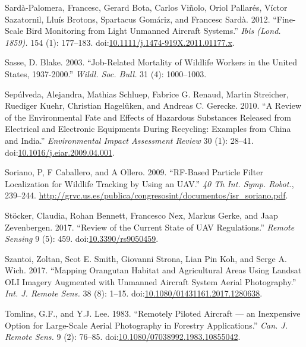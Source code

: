 \documentclass[]{interact}
\theoremstyle{plain}%
\theoremstyle{definition}
\theoremstyle{remark}
\begin{document}
\hypertarget{ref-sarda-palomera_fine-scale_2012}{}
Sardà-Palomera, Francesc, Gerard Bota, Carlos Viñolo, Oriol Pallarés,
Víctor Sazatornil, Lluís Brotons, Spartacus Gomáriz, and Francesc Sardà.
2012. ``Fine-Scale Bird Monitoring from Light Unmanned Aircraft
Systems.'' \emph{Ibis (Lond. 1859).} 154 (1): 177--183.
doi:\href{https://doi.org/10.1111/j.1474-919X.2011.01177.x}{10.1111/j.1474-919X.2011.01177.x}.

\hypertarget{ref-sasse_job-related_2003}{}
Sasse, D. Blake. 2003. ``Job-Related Mortality of Wildlife Workers in
the United States, 1937-2000.'' \emph{Wildl. Soc. Bull.} 31 (4):
1000--1003.

\hypertarget{ref-sepulveda_review_2010}{}
Sepúlveda, Alejandra, Mathias Schluep, Fabrice G. Renaud, Martin
Streicher, Ruediger Kuehr, Christian Hagelüken, and Andreas C. Gerecke.
2010. ``A Review of the Environmental Fate and Effects of Hazardous
Substances Released from Electrical and Electronic Equipments During
Recycling: Examples from China and India.'' \emph{Environmental Impact
Assessment Review} 30 (1): 28--41.
doi:\href{https://doi.org/10.1016/j.eiar.2009.04.001}{10.1016/j.eiar.2009.04.001}.

\hypertarget{ref-soriano_rf-based_2009}{}
Soriano, P, F Caballero, and A Ollero. 2009. ``RF-Based Particle Filter
Localization for Wildlife Tracking by Using an UAV.'' \emph{40 Th Int.
Symp. Robot.}, 239--244.
\url{http://grvc.us.es/publica/congresosint/documentos/isr_soriano.pdf}.

\hypertarget{ref-stocker_review_2017}{}
Stöcker, Claudia, Rohan Bennett, Francesco Nex, Markus Gerke, and Jaap
Zevenbergen. 2017. ``Review of the Current State of UAV Regulations.''
\emph{Remote Sensing} 9 (5): 459.
doi:\href{https://doi.org/10.3390/rs9050459}{10.3390/rs9050459}.

\hypertarget{ref-szantoi_mapping_2017}{}
Szantoi, Zoltan, Scot E. Smith, Giovanni Strona, Lian Pin Koh, and Serge
A. Wich. 2017. ``Mapping Orangutan Habitat and Agricultural Areas Using
Landsat OLI Imagery Augmented with Unmanned Aircraft System Aerial
Photography.'' \emph{Int. J. Remote Sens.} 38 (8): 1--15.
doi:\href{https://doi.org/10.1080/01431161.2017.1280638}{10.1080/01431161.2017.1280638}.

\hypertarget{ref-tomlins_remotely_1983}{}
Tomlins, G.F., and Y.J. Lee. 1983. ``Remotely Piloted Aircraft --- an
Inexpensive Option for Large-Scale Aerial Photography in Forestry
Applications.'' \emph{Can. J. Remote Sens.} 9 (2): 76--85.
doi:\href{https://doi.org/10.1080/07038992.1983.10855042}{10.1080/07038992.1983.10855042}.
\end{document}

